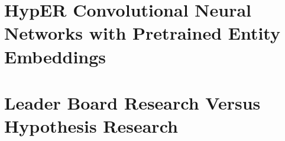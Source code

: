 \section{HypER Convolutional Neural Networks with Pretrained Entity Embeddings}

\section{Leader Board Research Versus Hypothesis Research}

